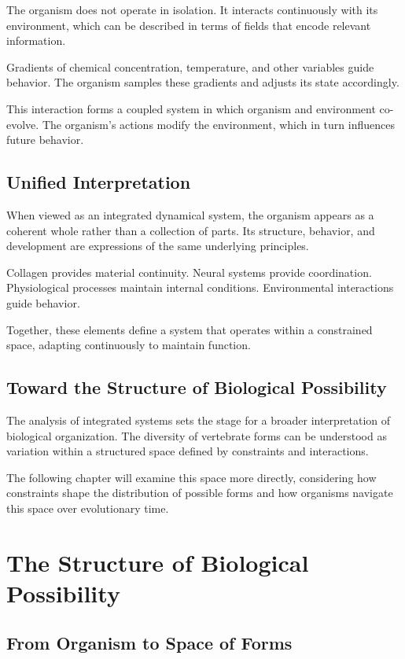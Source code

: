 \documentclass[11pt,oneside]{book}
\begin{document}
The organism does not operate in isolation. It interacts continuously with its environment, which can be described in terms of fields that encode relevant information.

Gradients of chemical concentration, temperature, and other variables guide behavior. The organism samples these gradients and adjusts its state accordingly.

This interaction forms a coupled system in which organism and environment co-evolve. The organism’s actions modify the environment, which in turn influences future behavior.

\section{Unified Interpretation}

When viewed as an integrated dynamical system, the organism appears as a coherent whole rather than a collection of parts. Its structure, behavior, and development are expressions of the same underlying principles.

Collagen provides material continuity. Neural systems provide coordination. Physiological processes maintain internal conditions. Environmental interactions guide behavior.

Together, these elements define a system that operates within a constrained space, adapting continuously to maintain function.

\section{Toward the Structure of Biological Possibility}

The analysis of integrated systems sets the stage for a broader interpretation of biological organization. The diversity of vertebrate forms can be understood as variation within a structured space defined by constraints and interactions.

The following chapter will examine this space more directly, considering how constraints shape the distribution of possible forms and how organisms navigate this space over evolutionary time.

\chapter{The Structure of Biological Possibility}

\section{From Organism to Space of Forms}
\end{document}
